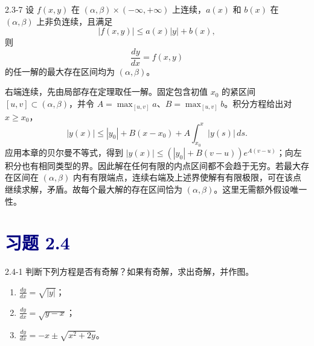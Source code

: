 \documentclass[UTF8,a4paper,11pt]{ctexart}
\newcommand{\sect}[1]{\section*{\textcolor{navy}{习题 #1}}}
\begin{document}
\begin{problem}{2.3-7}
设 $f(x,y)$ 在 $(\alpha,\beta)\times(-\infty,+\infty)$ 上连续，$a(x)$ 和 $b(x)$ 在 $(\alpha,\beta)$ 上非负连续，且满足
  \[
    |f(x,y)|\le a(x)|y|+b(x),
  \]
  则
  \[
    \frac{dy}{dx}=f(x,y)
  \]
  的任一解的最大存在区间均为 $(\alpha,\beta)$。
\end{problem}

\begin{solution}
右端连续，先由局部存在定理取任一解。固定包含初值 $x_0$ 的紧区间 $[u,v]\subset(\alpha,\beta)$，并令 $A=\max_{[u,v]}a$、$B=\max_{[u,v]}b$。积分方程给出对 $x\ge x_0$，
\[
|y(x)|\le |y_0|+B(x-x_0)+A\int_{x_0}^x|y(s)|\,ds.
\]
应用本章的贝尔曼不等式，得到 $|y(x)|\le(|y_0|+B(v-u))e^{A(v-u)}$；向左积分也有相同类型的界。因此解在任何有限的内点区间都不会趋于无穷。若最大存在区间在 $(\alpha,\beta)$ 内有有限端点，连续右端及上述界使解有有限极限，可在该点继续求解，矛盾。故每个最大解的存在区间恰为 $\boxed{(\alpha,\beta)}$。这里无需额外假设唯一性。
\end{solution}

\sect{2.4}
\begin{problem}{2.4-1}
判断下列方程是否有奇解？如果有奇解，求出奇解，并作图。
  \begin{enumerate}[label=(\arabic*)]
    \item $\displaystyle \frac{dy}{dx}=\sqrt{|y|}$；
    \item $\displaystyle \frac{dy}{dx}=\sqrt{y-x}$；
    \item $\displaystyle \frac{dy}{dx}=-x\pm\sqrt{x^2+2y}$。
  \end{enumerate}
\end{problem}
\end{document}
